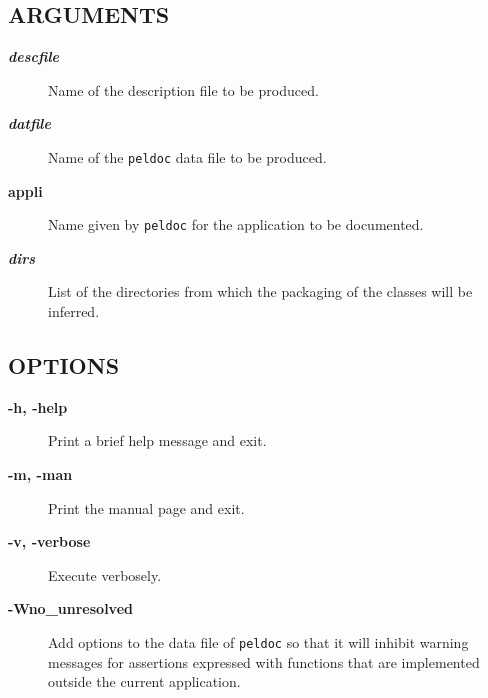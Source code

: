\documentclass{article}
\begin{document}
\subsection*{ARGUMENTS\label{predoc_ARGUMENTS}}
\begin{description}

\item[\textbf{ \emph{descfile} }] \mbox{}

Name of the description file to be produced.


\item[\textbf{ \emph{datfile} }] \mbox{}

Name of the \texttt{peldoc} data file to be produced.


\item[\textbf{appli}] \mbox{}

Name given by \texttt{peldoc} for the application to be documented.


\item[\textbf{ \emph{dirs} }] \mbox{}

List of the directories from which the packaging of the
classes will be inferred.

\end{description}
\subsection*{OPTIONS\label{predoc_OPTIONS}}
\begin{description}

\item[\textbf{-h, -help}] \mbox{}

Print a brief help message and exit.


\item[\textbf{-m, -man}] \mbox{}

Print the manual page and exit.


\item[\textbf{-v, -verbose}] \mbox{}

Execute verbosely.


\item[\textbf{-Wno\_unresolved}] \mbox{}

Add options to the data file of \texttt{peldoc} so that it will inhibit
warning messages for assertions expressed with functions that are
implemented outside the current application.

\end{description}
\end{document}
